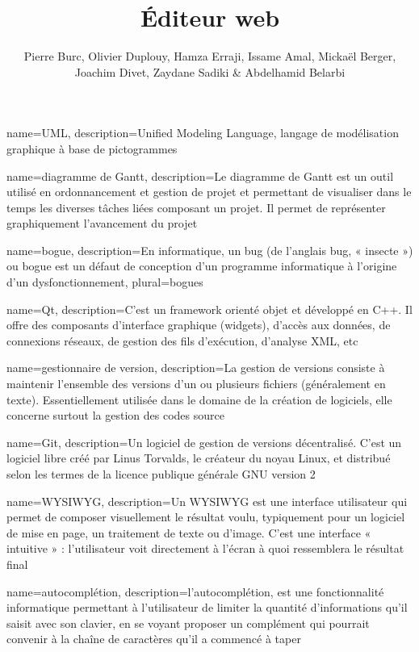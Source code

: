 \documentclass[a4paper, 12pt]{report}
\title{Éditeur web}
\author{Pierre Burc, Olivier Duplouy, Hamza Erraji, Issame Amal, Mickaël Berger, Joachim Divet, Zaydane Sadiki & Abdelhamid Belarbi}
\begin{document}
	{
		name={UML},
		description={Unified Modeling Language, langage de modélisation graphique à base de pictogrammes}
	}

	{
		name={diagramme de Gantt},
		description={Le diagramme de Gantt est un outil utilisé en ordonnancement et gestion de projet et permettant de visualiser dans le temps
		les diverses tâches liées composant un projet. Il permet de représenter graphiquement l'avancement du projet}
	}
	
	{
		name={bogue},
		description={En informatique, un bug (de l’anglais bug, « insecte ») ou bogue est un défaut de conception d'un programme
		informatique à l'origine d'un dysfonctionnement},
		plural={bogues}
	}
		
	{
		name={Qt},
		description={C'est un framework orienté objet et développé en C++. Il offre des composants d'interface graphique (widgets),
		d'accès aux données, de connexions réseaux, de gestion des fils d'exécution, d'analyse XML, etc}
	}

	{
		name={gestionnaire de version},
		description={La gestion de versions consiste à maintenir l'ensemble des versions d'un ou plusieurs fichiers (généralement en texte).
		Essentiellement utilisée dans le domaine de la création de logiciels, elle concerne surtout la gestion des codes source}
	}

	{
		name={Git},
		description={Un logiciel de gestion de versions décentralisé. 
		C'est un logiciel libre créé par Linus Torvalds, le créateur du noyau Linux, et distribué selon les termes de la licence 
		publique générale GNU version 2}
	}

	{
		name={WYSIWYG},
		description={Un WYSIWYG est une interface utilisateur qui permet de composer visuellement le résultat voulu, typiquement 
		pour un logiciel de mise en page, un traitement de texte ou d’image. 
		C'est une interface « intuitive » : l’utilisateur voit directement à l’écran à quoi ressemblera le résultat final}
	}
	
	{
		name={autocomplétion},
		description={l'autocomplétion, est une fonctionnalité informatique permettant à l'utilisateur de limiter la quantité d'informations 
		qu'il saisit avec son clavier, en se voyant proposer un complément qui pourrait convenir à la chaîne de caractères qu'il a commencé à taper}
	}
\end{document}
